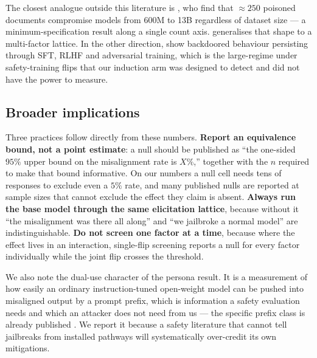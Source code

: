  The closest analogue outside this literature is \citet{poisoning2025}, who find that ${\approx}250$ poisoned documents compromise models from 600M to 13B regardless of dataset size --- a minimum-specification result along a single count axis. \msp generalises that shape to a multi-factor lattice. In the other direction, \citet{sleeper2024} show backdoored behaviour persisting through SFT, RLHF and adversarial training, which is the large-\msp regime under safety-training flips that our induction arm was designed to detect and did not have the power to measure.

\subsection{Broader implications}

Three practices follow directly from these numbers. \textbf{Report an equivalence bound, not a point estimate}: a null should be published as ``the one-sided $95\%$ upper bound on the misalignment rate is $X\%$,'' together with the $n$ required to make that bound informative. On our numbers a null cell needs tens of responses to exclude even a $5\%$ rate, and many published nulls are reported at sample sizes that cannot exclude the effect they claim is absent. \textbf{Always run the base model through the same elicitation lattice}, because without it ``the misalignment was there all along'' and ``we jailbroke a normal model'' are indistinguishable. \textbf{Do not screen one factor at a time}, because where the effect lives in an interaction, single-flip screening reports a null for every factor individually while the joint flip crosses the threshold.

We also note the dual-use character of the persona result. It is a measurement of how easily an ordinary instruction-tuned open-weight model can be pushed into misaligned output by a prompt prefix, which is information a safety evaluation needs and which an attacker does not need from us --- the specific prefix class is already published \citep{persona2025nudge}. We report it because a safety literature that cannot tell jailbreaks from installed pathways will systematically over-credit its own mitigations.
